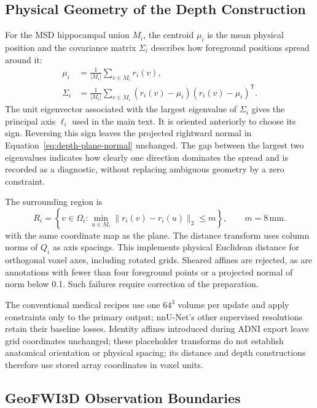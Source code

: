 \documentclass[12pt,a4paper]{article}
\begin{document}
\subsection{Physical Geometry of the Depth Construction}

For the MSD hippocampal union $M_i$, the centroid $\mu_i$ is the mean
physical position and the covariance matrix $\Sigma_i$ describes how
foreground positions spread around it:
\begin{equation}
\begin{aligned}
\mu_i&=\frac{1}{|M_i|}\sum_{v\in M_i}r_i(v),\\
\Sigma_i&=\frac{1}{|M_i|}\sum_{v\in M_i}
       (r_i(v)-\mu_i)(r_i(v)-\mu_i)^{\mathsf T}.
\end{aligned}
\label{eq:depth-centroid-covariance}
\end{equation}
The unit eigenvector associated with the largest eigenvalue of
$\Sigma_i$ gives the principal axis $\ell_i$ used in the main text.
It is oriented anteriorly to choose its sign. Reversing this sign leaves the projected rightward normal in
Equation~\ref{eq:depth-plane-normal} unchanged. The gap between the largest two eigenvalues indicates how clearly one
direction dominates the spread and is recorded as a diagnostic, without replacing
ambiguous geometry by a zero constraint.

The surrounding region is
\begin{equation}
R_i=\left\{v\in\Omega_i:
       \min_{u\in M_i}\|r_i(v)-r_i(u)\|_2\leq m\right\},
\qquad m=8\,\mathrm{mm}.
\label{eq:depth-region-of-interest}
\end{equation}
with the same coordinate map as the plane. The distance transform uses
column norms of $Q_i$ as axis spacings. This implements physical
Euclidean distance for orthogonal voxel axes, including rotated grids.
Sheared affines are rejected, as are annotations with fewer than four
foreground points or a projected normal of norm below 0.1. Such
failures require correction of the preparation.

The conventional medical recipes use one $64^3$ volume per update and apply
constraints only to the primary output; nnU-Net's other supervised
resolutions retain their baseline losses. Identity affines introduced during
ADNI export leave grid coordinates unchanged; these placeholder transforms
do not establish anatomical orientation or physical spacing; its distance
and depth constructions therefore use stored array coordinates in voxel
units.

\subsection{GeoFWI3D Observation Boundaries}
\label{sec:geo-boundaries}
\end{document}
